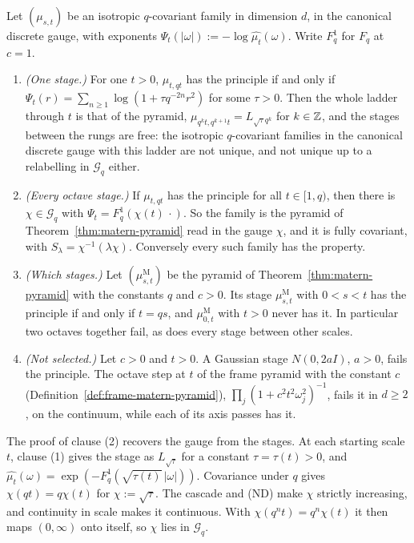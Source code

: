 \begin{theorem}
\label{thm:selection-stratum-two}

Let $(\mu_{s,t})$ be an isotropic $q$-covariant family in dimension $d$, in the canonical discrete
gauge, with exponents $\Psi_t(|\omega|) := -\log\widehat{\mu_t}(\omega)$. Write $F^1_q$ for $F_q$ at
$c = 1$.
\begin{enumerate}
\item \emph{(One stage.)} For one $t > 0$, $\mu_{t,qt}$ has the principle if and only if
$\Psi_t(r) = \sum_{n \ge 1}\log(1 + \tau q^{-2n}r^2)$ for some $\tau > 0$. Then the whole ladder
through $t$ is that of the \Matern{} pyramid, $\mu_{q^kt,q^{k+1}t} = L_{\sqrt\tau q^k}$ for
$k \in \mathbb{Z}$, and the stages between the rungs are free: the isotropic $q$-covariant families in
the canonical discrete gauge with this ladder are not unique, and not unique up to a relabelling in
$\mathcal{G}_q$ either.
\item \emph{(Every octave stage.)} If $\mu_{t,qt}$ has the principle for all $t \in [1, q)$, then
there is $\chi \in \mathcal{G}_q$ with $\Psi_t = F^1_q(\chi(t)\,\cdot)$. So the family is the
\Matern{} pyramid of Theorem~\ref{thm:matern-pyramid} read in the gauge $\chi$, and it is fully
covariant, with $S_\lambda = \chi^{-1}(\lambda\chi)$. Conversely every such family has the
property.
\item \emph{(Which stages.)} Let $(\mu^{\mathrm M}_{s,t})$ be the \Matern{} pyramid of
Theorem~\ref{thm:matern-pyramid} with the constants $q$ and $c > 0$. Its stage
$\mu^{\mathrm M}_{s,t}$ with $0 < s < t$ has the principle if and only if $t = qs$, and
$\mu^{\mathrm M}_{0,t}$ with $t > 0$ never has it. In particular two octaves together fail, as does every stage
between other scales.
\item \emph{(Not selected.)} Let $c > 0$ and $t > 0$. A Gaussian stage $N(0, 2aI)$, $a > 0$, fails
the principle. The octave step at $t$ of the frame \Matern{} pyramid with the constant $c$
(Definition~\ref{def:frame-matern-pyramid}),
$\prod_j(1 + c^2t^2\omega_j^2)^{-1}$, fails it in $d \ge 2$, on the continuum, while each of its
axis passes has it.
\end{enumerate}
\end{theorem}

The proof of clause (2) recovers the gauge from the stages. At each starting scale $t$, clause (1)
gives the stage as $L_{\sqrt{\tau}}$ for a constant $\tau = \tau(t) > 0$, and
$\widehat{\mu_t}(\omega) = \exp(-F^1_q(\sqrt{\tau(t)}\,|\omega|))$. Covariance under $q$ gives
$\chi(qt) = q\chi(t)$ for $\chi := \sqrt\tau$. The cascade and (ND) make $\chi$ strictly increasing,
and continuity in scale makes it continuous. With $\chi(q^nt) = q^n\chi(t)$ it then maps
$(0, \infty)$ onto itself, so $\chi$ lies in $\mathcal{G}_q$.

